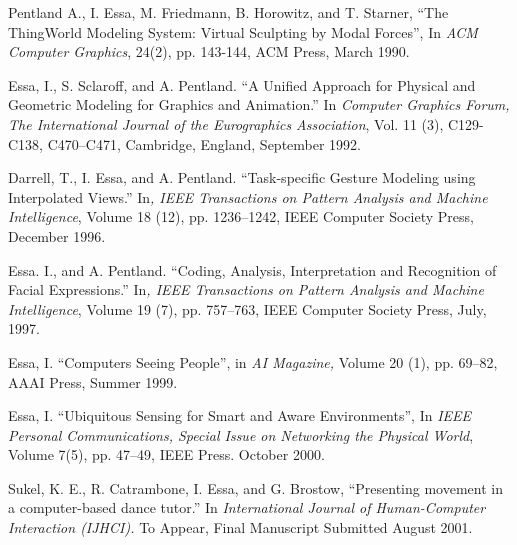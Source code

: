 \begin{pub}

\item Pentland A., I. Essa, M. Friedmann, B. Horowitz, and T. Starner, ``The
ThingWorld Modeling System: Virtual Sculpting by Modal Forces'',
In \textit{ACM Computer Graphics}, 24(2), pp. 143-144, ACM Press,
March 1990.


\item Essa, I., S. Sclaroff, and A. Pentland. ``A Unified Approach
for Physical and Geometric Modeling for Graphics and Animation.''
In \textit{Computer Graphics Forum, The International Journal of
the Eurographics Association}, Vol. 11 (3), C129-C138, C470--C471,
Cambridge, England, September 1992.

\item Darrell, T., I. Essa, and A. Pentland. ``Task-specific Gesture Modeling
using Interpolated Views.'' In\textit{, IEEE Transactions on
Pattern Analysis and Machine Intelligence}, Volume 18 (12), pp.
1236--1242, IEEE Computer Society Press, December 1996.
\label{pub:pami96}

\item Essa. I., and A. Pentland. ``Coding, Analysis, Interpretation and
Recognition of Facial Expressions.'' In\textit{, IEEE Transactions
on Pattern Analysis and Machine Intelligence}, Volume 19 (7), pp.
757--763, IEEE Computer Society Press, July, 1997.
\label{pub:pami97}

\item Essa, I. ``Computers Seeing People'', in \textit{AI Magazine,}
Volume 20 (1), pp. 69--82, AAAI Press, Summer 1999.
\label{pub:aimag00}

\item Essa, I. ``Ubiquitous Sensing for Smart and Aware Environments'',
 In \textit{IEEE Personal Communications, Special Issue on
Networking the Physical World}, Volume 7(5), pp. 47--49, IEEE
Press. October 2000.

\item Sukel, K. E., R. Catrambone, I. Essa, and G. Brostow, ``Presenting movement
in a computer-based dance tutor.'' In \textit{International
Journal of Human-Computer Interaction (IJHCI).} To Appear, Final
Manuscript Submitted August 2001. \label{pub:dance-ijhci00}


\end{pub}


